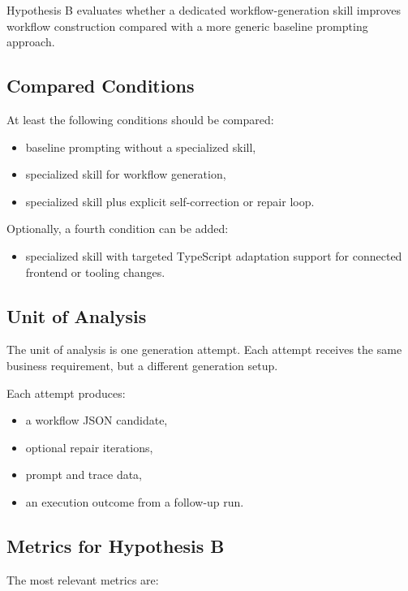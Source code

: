 \documentclass[12pt,a4paper]{article}
\begin{document}
Hypothesis B evaluates whether a dedicated workflow-generation skill improves workflow construction compared with a more generic baseline prompting approach.

\subsection{Compared Conditions}

At least the following conditions should be compared:

\begin{itemize}
  \item baseline prompting without a specialized skill,
  \item specialized skill for workflow generation,
  \item specialized skill plus explicit self-correction or repair loop.
\end{itemize}

Optionally, a fourth condition can be added:

\begin{itemize}
  \item specialized skill with targeted TypeScript adaptation support for connected frontend or tooling changes.
\end{itemize}

\subsection{Unit of Analysis}

The unit of analysis is one generation attempt. Each attempt receives the same business requirement, but a different generation setup.

Each attempt produces:

\begin{itemize}
  \item a workflow JSON candidate,
  \item optional repair iterations,
  \item prompt and trace data,
  \item an execution outcome from a follow-up run.
\end{itemize}

\subsection{Metrics for Hypothesis B}

The most relevant metrics are:
\end{document}
